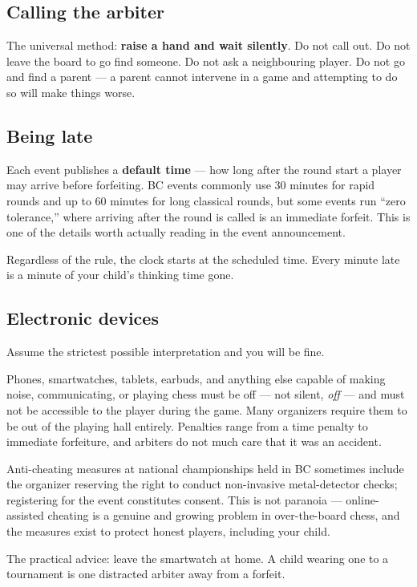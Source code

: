 \documentclass[10pt,letterpaper]{article}
\newcommand{\term}[1]{\textbf{#1}}
\begin{document}
\subsection{Calling the arbiter}

The universal method: \textbf{raise a hand and wait silently}. Do not call out.
Do not leave the board to go find someone. Do not ask a neighbouring player.
Do not go and find a parent --- a parent cannot intervene in a game and
attempting to do so will make things worse.

\subsection{Being late}

Each event publishes a \term{default time} --- how long after the round start a
player may arrive before forfeiting. BC events commonly use 30 minutes for
rapid rounds and up to 60 minutes for long classical rounds, but some events run
``zero tolerance,'' where arriving after the round is called is an immediate
forfeit. This is one of the details worth actually reading in the event
announcement.

Regardless of the rule, the clock starts at the scheduled time. Every minute
late is a minute of your child's thinking time gone.

\subsection{Electronic devices}

Assume the strictest possible interpretation and you will be fine.

Phones, smartwatches, tablets, earbuds, and anything else capable of making
noise, communicating, or playing chess must be off --- not silent, \emph{off}
--- and must not be accessible to the player during the game. Many organizers require them to be out of the
playing hall entirely. Penalties range from a time penalty to immediate
forfeiture, and arbiters do not much care that it was an accident.

Anti-cheating measures at national championships held in BC sometimes include the organizer
reserving the right to conduct non-invasive metal-detector checks; registering
for the event constitutes consent. This is not paranoia --- online-assisted
cheating is a genuine and growing problem in over-the-board chess, and the
measures exist to protect honest players, including your child.

The practical advice: leave the smartwatch at home. A child wearing one to a
tournament is one distracted arbiter away from a forfeit.
\end{document}
